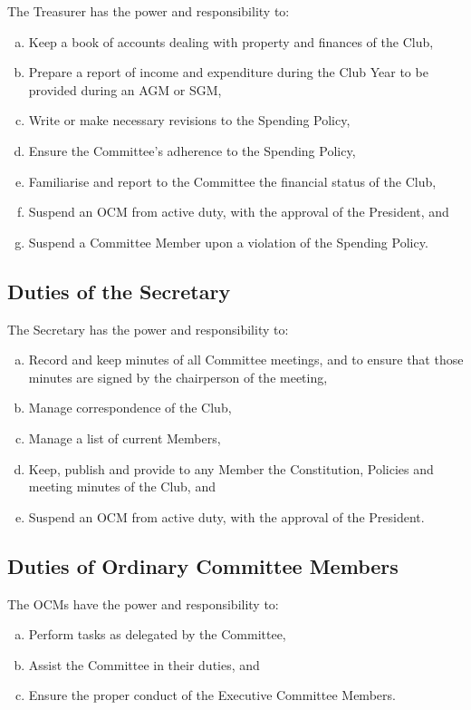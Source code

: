 \documentclass[a4paper,12pt]{article}
\begin{document}
The Treasurer has the power and responsibility to:

\begin{enumerate}[a)]
	\item Keep a book of accounts dealing with property and finances of the Club,
	\item Prepare a report of income and expenditure during the Club Year to be provided during an AGM or SGM,
	\item Write or make necessary revisions to the Spending Policy,
	\item Ensure the Committee's adherence to the Spending Policy,
	\item Familiarise and report to the Committee the financial status of the Club,
	\item Suspend an OCM from active duty, with the approval of the President, and
	\item Suspend a Committee Member upon a violation of the Spending Policy.
\end{enumerate}

\subsection{Duties of the Secretary}

The Secretary has the power and responsibility to:

\begin{enumerate}[a)]
	\item Record and keep minutes of all Committee meetings, and to ensure that those minutes are signed by the chairperson of the meeting,
	\item Manage correspondence of the Club,
	\item Manage a list of current Members,
	\item Keep, publish and provide to any Member the Constitution, Policies and meeting minutes of the Club, and
	\item Suspend an OCM from active duty, with the approval of the President.
\end{enumerate}

\subsection{Duties of Ordinary Committee Members}

The OCMs have the power and responsibility to:

\begin{enumerate}[a)]
	\item Perform tasks as delegated by the Committee,
	\item Assist the Committee in their duties, and
	\item Ensure the proper conduct of the Executive Committee Members.
\end{enumerate}
\end{document}
